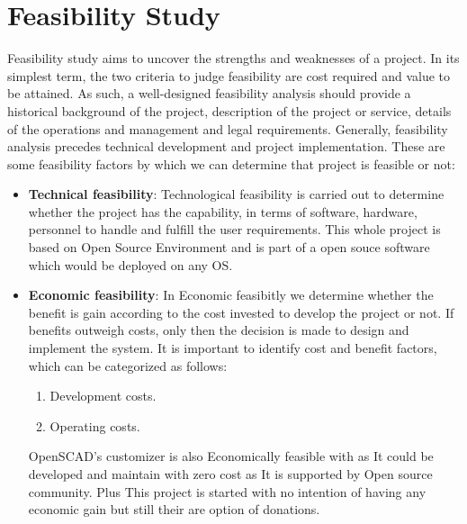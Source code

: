 \section{Feasibility Study}
Feasibility study aims to uncover the strengths and weaknesses of 
a project. In its simplest term, the two criteria to judge feasibility 
are cost required and value to be attained. As such, a well-designed 
feasibility analysis should provide a historical background of the 
project, description of the project or service, details of the 
operations and management and legal requirements. Generally, feasibility 
analysis precedes technical development and project implementation. 
These are some feasibility factors by which we can determine that 
project is feasible or not:
\begin{itemize}
\item {\bf{Technical feasibility}}: Technological feasibility is carried 
out to determine whether the project has the capability, in terms of 
software, hardware, personnel to handle and fulfill the user requirements. This whole project is based on Open 
Source Environment and is part of a open souce software which would be deployed on any OS.

\item {\bf{Economic feasibility}}: In Economic feasibitly we 
determine whether the benefit is gain according to the cost invested 
to develop the project or not. If benefits outweigh costs, only then 
the decision is made to design and implement the system. It is 
important to identify cost and benefit factors, which can be categorized 
as follows:
\begin{enumerate}
\item Development costs.
\item Operating costs.
\end{enumerate}
OpenSCAD's customizer is also Economically feasible with as It could be developed and maintain with zero cost as It is supported by Open source community.
Plus This project is started with no intention of having any economic gain but still their are option of donations. 

\end{itemize}


